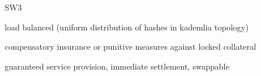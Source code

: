 \begin{frame}{SW3}
\begin{block}{}
load balanced (uniform distribution of hashes in kademlia topology)
\end{block}
\begin{block}{}
compensatory insurance or punitive measures against locked collateral
\end{block}
\begin{block}{}
guaranteed service provision, immediate settlement, swappable
\end{block}
\end{frame}
